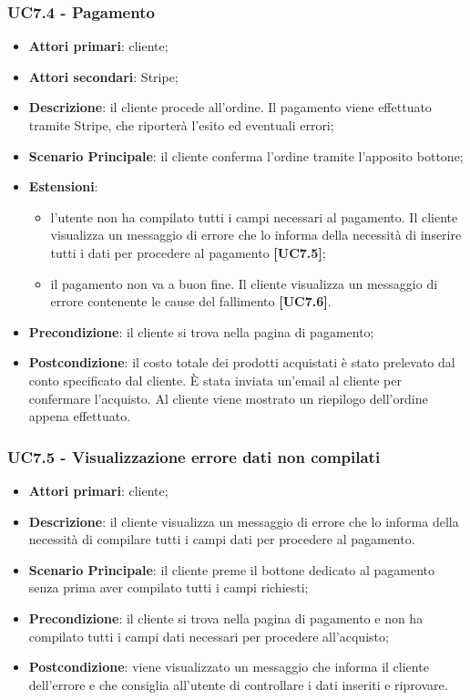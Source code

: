 \subsubsection{UC7.4 - Pagamento}
\begin{itemize}
\item \textbf{Attori primari}: cliente;
\item \textbf{Attori secondari}: Stripe;
\item \textbf{Descrizione}: il cliente procede all'ordine. Il pagamento viene effettuato tramite Stripe, che riporterà l'esito ed eventuali errori;
\item \textbf{Scenario Principale}: il cliente conferma l'ordine tramite l'apposito bottone;
\item \textbf{Estensioni}:
\begin{itemize}
	\item l'utente non ha compilato tutti i campi necessari al pagamento. Il cliente visualizza un messaggio di errore che lo informa della necessità di inserire tutti i dati per procedere al pagamento \textbf{[UC7.5]};
	\item il pagamento non va a buon fine. Il cliente visualizza un messaggio di errore contenente le cause del fallimento \textbf{[UC7.6]}.
\end{itemize}
\item \textbf{Precondizione}: il cliente si trova nella pagina di pagamento;
\item \textbf{Postcondizione}: il costo totale dei prodotti acquistati è stato prelevato dal conto specificato dal cliente. È stata inviata un'email al cliente per confermare l'acquisto. Al cliente viene mostrato un riepilogo dell'ordine appena effettuato.
\end{itemize}

\subsubsection{UC7.5 - Visualizzazione errore dati non compilati}
\begin{itemize}
\item \textbf{Attori primari}: cliente;
\item \textbf{Descrizione}: il cliente visualizza un messaggio di errore che lo informa della necessità di compilare tutti i campi dati per procedere al pagamento.
\item \textbf{Scenario Principale}: il cliente preme il bottone dedicato al pagamento senza prima aver compilato tutti i campi richiesti;
\item \textbf{Precondizione}: il cliente si trova nella pagina di pagamento e non ha compilato tutti i campi dati necessari per procedere all'acquisto;
\item \textbf{Postcondizione}: viene visualizzato un messaggio che informa il cliente dell'errore e che consiglia all'utente di controllare i dati inseriti e riprovare.
\end{itemize}

